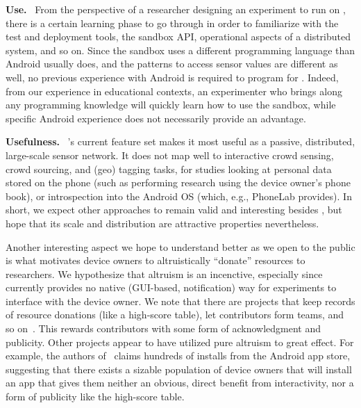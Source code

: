 \textbf{Use.}~
From the perspective of a researcher designing an experiment to 
run on \sysname, there is a certain learning phase 
to go through in order to familiarize with the test and deployment 
tools, the sandbox API, operational aspects of a distributed system, 
and so on. Since the sandbox uses a different programming language 
than Android usually does, and the patterns to access sensor values 
are different as well, no previous experience with Android is required 
to program for \sysname. Indeed, from our experience in 
educational contexts, an experimenter who brings along any programming 
knowledge will quickly learn how to use the sandbox, while specific 
Android experience does not necessarily provide an advantage.


\textbf{Usefulness.}~
\sysname's current feature set makes it most 
useful as a passive, distributed, large-scale sensor network. 
It does not map well to interactive crowd sensing, crowd sourcing, 
and (geo) tagging tasks, for studies looking at personal data stored 
on the phone (such as performing research using the device owner's 
phone book),
or introspection into the Android OS (which, e.g., PhoneLab provides). 
In short, we expect other approaches to remain valid and interesting 
besides \sysname, but hope that its scale and distribution 
are attractive properties nevertheless.


Another interesting aspect we hope to understand better as 
we open \sysname to the public is what motivates device 
owners to altruistically ``donate'' resources to researchers. 
We hypothesize that altruism is an incenctive, especially since 
\sysname currently provides no native (GUI-based, 
notification) way for experiments to interface with the device 
owner. We note that there are projects that keep records of 
resource donations (like a high-score table), let contributors form 
teams, and so on~\cite{OpenWLANMap}.
This rewards contributors with some form of acknowledgment and 
publicity. Other projects appear to have utilized pure altruism to 
great effect. For example, the authors of~\cite{wang2011untold} 
claims hundreds of installs from the Android app 
store, suggesting that there exists a sizable population of device 
owners that will install an app that gives them neither an obvious, 
direct benefit from interactivity, nor a form of publicity like 
the high-score table.


